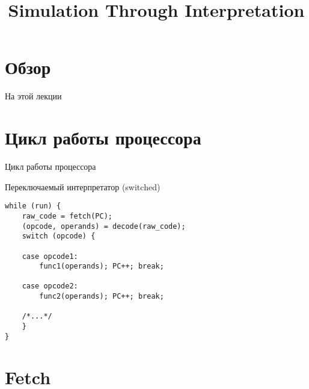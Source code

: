 

\newif\ifilab
\ilabtrue

\title{Simulation Through Interpretation}



\begin{frame}
\titlepage
\end{frame}

\section*{Обзор}

\ifilab\else
\begin{frame}{На прошлой лекции}
\end{frame}
\fi

\begin{frame}{На этой лекции}
\tableofcontents
\end{frame} 


\section{Цикл работы процессора}

\begin{frame}{Цикл работы процессора}
\centering
{}
\end{frame}

\begin{frame}[fragile]{Переключаемый интерпретатор (switched)}
\begin{lstlisting}
while (run) {
    raw_code = fetch(PC);
    (opcode, operands) = decode(raw_code);
    switch (opcode) {

    case opcode1:
        func1(operands); PC++; break;

    case opcode2:
        func2(operands); PC++; break;

    /*...*/
    }
}
\end{lstlisting}
\end{frame}

\ifilab\else
\begin{frame}{Уточненный цикл работы}
\centering
\resizebox{9cm}{7cm}{
\inputpicture{interp-cycle-expanded-exception}
}
\end{frame}
\fi

\section{Fetch}

